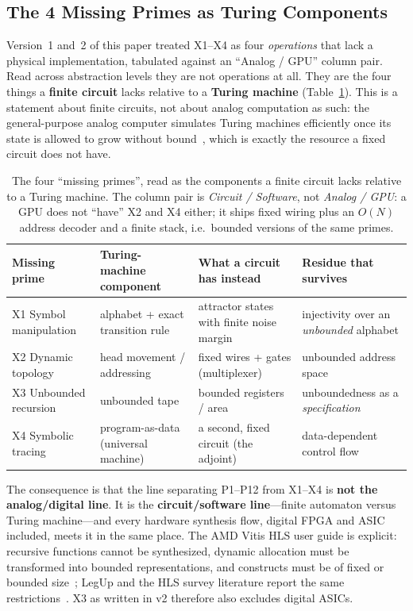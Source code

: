\documentclass[11pt]{article}
\begin{document}
\subsection{The 4 Missing Primes as Turing Components}
\label{sec:missing}

Version~1 and~2 of this paper treated X1--X4 as four \textit{operations} that lack a physical implementation, tabulated against an ``Analog / GPU'' column pair. Read across abstraction levels they are not operations at all. They are the four things a \textbf{finite circuit} lacks relative to a \textbf{Turing machine} (Table~\ref{tab:missing}). This is a statement about finite circuits, not about analog computation as such: the general-purpose analog computer simulates Turing machines efficiently once its state is allowed to grow without bound~\cite{pouly2013}, which is exactly the resource a fixed circuit does not have.

\begin{table}[h]
\centering
\caption{The four ``missing primes'', read as the components a finite circuit lacks relative to a Turing machine. The column pair is \textit{Circuit / Software}, not \textit{Analog / GPU}: a GPU does not ``have'' X2 and X4 either; it ships fixed wiring plus an $O(N)$ address decoder and a finite stack, i.e.\ bounded versions of the same primes.}
\label{tab:missing}
\footnotesize
\begin{tabular}{p{2.3cm}p{4.2cm}p{4.4cm}p{3.1cm}}
\toprule
Missing prime & Turing-machine component & What a circuit has instead & Residue that survives \\
\midrule
X1 Symbol manipulation & alphabet + exact transition rule & attractor states with finite noise margin & injectivity over an \textit{unbounded} alphabet \\
X2 Dynamic topology & head movement / addressing & fixed wires + gates (multiplexer) & unbounded address space \\
X3 Unbounded recursion & unbounded tape & bounded registers / area & unboundedness as a \textit{specification} \\
X4 Symbolic tracing & program-as-data (universal machine) & a second, fixed circuit (the adjoint) & data-dependent control flow \\
\bottomrule
\end{tabular}
\end{table}

The consequence is that the line separating P1--P12 from X1--X4 is \textbf{not the analog/digital line}. It is the \textbf{circuit/software line}---finite automaton versus Turing machine---and every hardware synthesis flow, digital FPGA and ASIC included, meets it in the same place. The AMD Vitis HLS user guide is explicit: recursive functions cannot be synthesized, dynamic allocation must be transformed into bounded representations, and constructs must be of fixed or bounded size~\cite{ug1399}; LegUp and the HLS survey literature report the same restrictions~\cite{nane2016}. X3 as written in v2 therefore also excludes digital ASICs.
\end{document}
